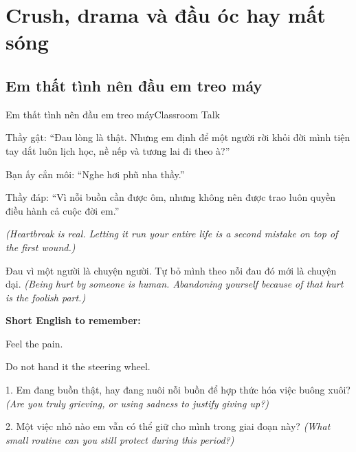\chapter{Crush, drama và đầu óc hay mất sóng}

\section{Em thất tình nên đầu em treo máy}
\begin{truyen}{Em thất tình nên đầu em treo máy}{Classroom Talk}

Thầy gật: ``Đau lòng là thật. Nhưng em định để một người rời khỏi đời mình tiện tay dắt luôn lịch học, nề nếp và tương lai đi theo à?''

Bạn ấy cắn môi: ``Nghe hơi phũ nha thầy.''

Thầy đáp: ``Vì nỗi buồn cần được ôm, nhưng không nên được trao luôn quyền điều hành cả cuộc đời em.''

\textit{(Heartbreak is real. Letting it run your entire life is a second mistake on top of the first wound.)}
\end{truyen}

\begin{baihoc}
Đau vì một người là chuyện người. Tự bỏ mình theo nỗi đau đó mới là chuyện dại.
\textit{(Being hurt by someone is human. Abandoning yourself because of that hurt is the foolish part.)}
\end{baihoc}

\begin{ghinhoanh}
\textbf{Short English to remember:}

Feel the pain.

Do not hand it the steering wheel.
\end{ghinhoanh}

\begin{tuhocnhanh}
1. Em đang buồn thật, hay đang nuôi nỗi buồn để hợp thức hóa việc buông xuôi? \textit{(Are you truly grieving, or using sadness to justify giving up?)}

2. Một việc nhỏ nào em vẫn có thể giữ cho mình trong giai đoạn này? \textit{(What small routine can you still protect during this period?)}
\end{tuhocnhanh}
\ngancach

